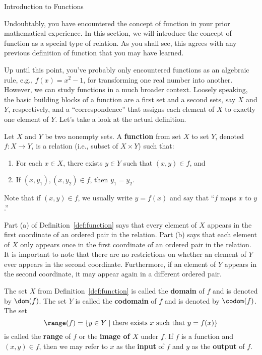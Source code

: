 \begin{section}{Introduction to Functions}

Undoubtably, you have encountered the concept of function in your prior mathematical experience.  In this section, we will introduce the concept of function as a special type of relation.  As you shall see, this agrees with any previous definition of function that you may have learned.  

Up until this point, you've probably only encountered functions as an algebraic rule, e.g., $f(x)=x^{2}-1$, for transforming one real number into another.  However, we can study functions in a much broader context.  Loosely speaking, the basic building blocks of a function are a first set and a second sets, say $X$ and $Y$, respectively, and a ``correspondence'' that assigns each element of $X$ to exactly one element of $Y$.  Let's take a look at the actual definition.

\begin{definition}\label{def:function}
Let $X$ and $Y$ be two nonempty sets.  A \textbf{function} from set $X$ to set $Y$, denoted $f:X\to Y$, is a relation (i.e., subset of $X\times Y$) such that:
\begin{enumerate}[label=\textrm{(\alph*)}]
\item For each $x\in X$, there exists $y\in Y$ such that $(x,y)\in f$, and
\item If $(x,y_{1}), (x,y_{2}) \in f$, then $y_{1}=y_{2}$.
\end{enumerate}
Note that if $(x,y)\in f$, we usually write $y=f(x)$ and say that ``$f$ maps $x$ to $y$.''
\end{definition}

Part (a) of Definition~\ref{def:function} says that every element of $X$ appears in the first coordinate of an ordered pair in the relation.  Part (b) says that each element of $X$ only appears once in the first coordinate of an ordered pair in the relation.  It is important to note that there are no restrictions on whether an element of $Y$ ever appears in the second coordinate.  Furthermore, if an element of $Y$ appears in the second coordinate, it may appear again in a different ordered pair.

\begin{definition}
The set $X$ from Definition~\ref{def:function} is called the \textbf{domain} of $f$ and is denoted by $\dom(f)$.  The set $Y$ is called the \textbf{codomain} of $f$ and is denoted by $\codom(f)$.  The set
\[
\range(f)=\{y\in Y\mid \mbox{there exists }x\mbox{ such that } y=f(x)\}
\]
is called the \textbf{range} of $f$ or the \textbf{image of $X$} under $f$. If $f$ is a function and $(x,y)\in f$, then we may refer to $x$ as the \textbf{input} of $f$ and $y$ as the \textbf{output} of $f$.
\end{definition}


\end{section}
